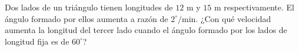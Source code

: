 \item Dos lados de un triángulo tienen longitudes de $12 \text{ m}$ y $15 \text{ m}$ respectivamente. El ángulo formado por ellos aumenta a razón de $2^\circ/\text{min}$. ¿Con qué velocidad aumenta la longitud del tercer lado cuando el ángulo formado por los lados de longitud fija es de $60^\circ$?
